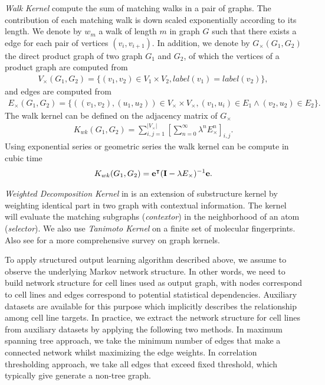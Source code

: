 {%
\textit{Walk Kernel} \citep{Kashima03marginalized,Gartner03a} compute the sum of matching walks in a pair of graphs. 
The contribution of each matching walk is down scaled exponentially according to its length.  
We denote by $w_m$ a walk of length $m$ in graph $G$ such that there exists a edge for each pair of vertices $(v_i,v_{i+1})$.
In addition, we denote by $G_{\times}(G_1,G_2)$ the direct product graph of two graph $G_1$ and $G_2$, of which the vertices of a product graph are computed from 
\begin{align*}
	V_{\times}(G_1,G_2) = \{(v_1,v_2)\in V_1\times V_2, label(v_1)=label(v_2)\},
\end{align*}
and edges are computed from
\begin{align*}
	E_{\times}(G_1,G_2) = \{((v_1,v_2),(u_1,u_2))\in V_{\times}\times V_{\times},(v_1,u_i)\in E_1\wedge (v_2,u_2)\in E_2\}.
\end{align*}
The walk kernel can be defined on the adjacency matrix of $G_{\times}$
\begin{align*}
	K_{wk}(G_1,G_2) = \sum_{i,j=1}^{|V_{\times}|}\left[\sum_{n=0}^{\infty}\lambda^{n}E_{\times}^n\right]_{i,j}.
\end{align*}
Using exponential series or geometric series the walk kernel can be compute in cubic time \citep{Gartner03a}
\begin{align*}
	K_{wk}(G_1,G_2) = \mathbf {e}^{\intercal}(\mathbf{I}-\lambda E_{\times})^{-1}\mathbf {e}.
\end{align*}

\textit{Weighted Decomposition Kernel} in \citep{Menchetti05weighted,Ceroni08classification} is an extension of substructure kernel \citep{Haussler99convolution} by weighting identical part in two graph with contextual information.
The kernel will evaluate the matching subgraphs (\textit{contextor}) in the neighborhood of an atom (\textit{selector}).
We also use \textit{Tanimoto Kernel} \citep{Ralaivola05graph} on a finite set of molecular fingerprints.
Also see \citep{Vishwanathan10graph} for a more comprehensive survey on graph kernels.

To apply structured output learning algorithm described above, we assume to observe the underlying Markov network structure.
In other words, we need to build network structure for cell lines used as output graph, with nodes correspond to cell lines and edges correspond to potential statistical dependencies.
Auxiliary datasets are available for this purpose \citep{Shoemaker06the}  which implicitly describes the relationship among cell line targets.
In practice, we extract the network structure for cell lines from auxiliary datasets by applying the following two methods.
In maximum spanning tree approach, we take the minimum number of edges that make a connected network whilst maximizing the edge weights.
In correlation thresholding approach, we take all edges that exceed fixed threshold, which typically give generate a non-tree graph.


}
